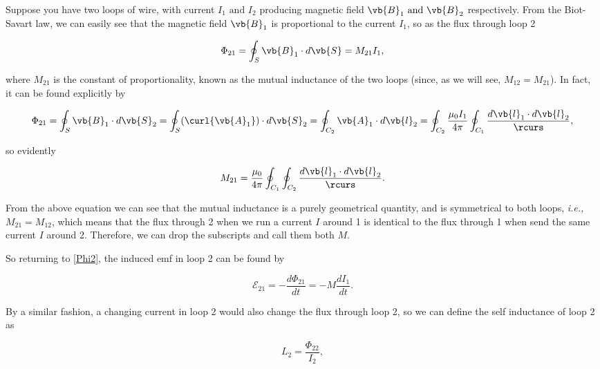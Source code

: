 \documentclass[english,a4paper,12pt]{report}
\begin{document}
Suppose you have two loops of wire, with current \(I_1 \text { and } I_2 \) producing magnetic field \(\vb{B} _{1} \text { and } \vb{B} _{2}\) respectively. From the Biot-Savart law, we can easily see that the magnetic field \(\vb{B} _{1} \) is proportional to the current \(I_1 \), so as the flux through loop 2 

\begin{equation} \label{Phi2} 
    \Phi _{21} = \oint_{S} \vb{B} _{1} \cdot d\vb{S} = M_{21} I_1 ,    
\end{equation}

where \(M_{21} \) is the constant of proportionality, known as the mutual inductance of the two loops (since, as we will see, \(M_{12} = M_{21}  \)). In fact, it can be found explicitly by

\begin{equation}
    \Phi _{21} = \oint_{S} \vb{B} _{1} \cdot d \vb{S} _{2} = \oint_{S} (\curl{\vb{A} _{1} }  ) \cdot d\vb{S} _{2} = \oint_{C_2 } \vb{A} _{1} \cdot d \vb{l} _{2} = \oint_{C_2 } \frac{\mu _{0} I_1  }{4\pi }\oint_{C_1 } \frac{d \vb{l} _{1} \cdot d \vb{l} _{2}  }{\rcurs },            
\end{equation}

so evidently

\begin{equation}
    M_{21} = \frac{\mu _{0} }{4 \pi } \oint_{C_1 }\oint_{C_2 } \frac{d \vb{l} _{1} \cdot d \vb{l} _{2} }{\rcurs }.     
\end{equation}

From the above equation we can see that the mutual inductance is a purely geometrical quantity, and is symmetrical to both loops, \textit{i.e.,} \(M_{21} = M_{12}  \), which means that the flux through 2 when we run a current \(I\) around 1 is identical to the flux through 1 when send the same current \(I\) around 2. Therefore, we can drop the subscripts and call them both \(M\).

So returning to \cref{Phi2}, the induced emf in loop 2 can be found by 

\begin{equation}
    \mathcal{E}_{21} = - \frac{d\Phi _{21} }{dt} = - M \frac{dI_1 }{dt}.  
\end{equation}

By a similar fashion, a changing current in loop 2 would also change the flux through loop 2, so we can define the self inductance of loop 2 as 

\begin{equation}
    L_2  = \frac{\Phi _{22}  }{I_2 }, 
\end{equation}
\end{document}
